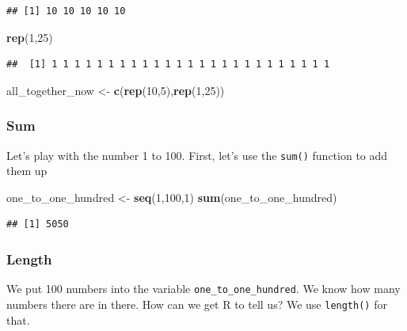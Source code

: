 \documentclass[
]{book}
\newenvironment{Shaded}{\begin{snugshade}}{\end{snugshade}}
\newcommand{\DecValTok}[1]{\textcolor[rgb]{0.00,0.00,0.81}{#1}}
\newcommand{\FunctionTok}[1]{\textcolor[rgb]{0.13,0.29,0.53}{\textbf{#1}}}
\newcommand{\NormalTok}[1]{#1}
\newcommand{\OtherTok}[1]{\textcolor[rgb]{0.56,0.35,0.01}{#1}}
\begin{document}
\begin{verbatim}
## [1] 10 10 10 10 10
\end{verbatim}

\begin{Shaded}
\begin{Highlighting}[]
\FunctionTok{rep}\NormalTok{(}\DecValTok{1}\NormalTok{,}\DecValTok{25}\NormalTok{)}
\end{Highlighting}
\end{Shaded}

\begin{verbatim}
##  [1] 1 1 1 1 1 1 1 1 1 1 1 1 1 1 1 1 1 1 1 1 1 1 1 1 1
\end{verbatim}

\begin{Shaded}
\begin{Highlighting}[]
\NormalTok{all\_together\_now }\OtherTok{\textless{}{-}} \FunctionTok{c}\NormalTok{(}\FunctionTok{rep}\NormalTok{(}\DecValTok{10}\NormalTok{,}\DecValTok{5}\NormalTok{),}\FunctionTok{rep}\NormalTok{(}\DecValTok{1}\NormalTok{,}\DecValTok{25}\NormalTok{)) }
\end{Highlighting}
\end{Shaded}

\hypertarget{sum}{%
\subsubsection{Sum}\label{sum}}

Let's play with the number 1 to 100. First, let's use the \texttt{sum()} function to add them up

\begin{Shaded}
\begin{Highlighting}[]
\NormalTok{one\_to\_one\_hundred }\OtherTok{\textless{}{-}} \FunctionTok{seq}\NormalTok{(}\DecValTok{1}\NormalTok{,}\DecValTok{100}\NormalTok{,}\DecValTok{1}\NormalTok{)}
\FunctionTok{sum}\NormalTok{(one\_to\_one\_hundred)}
\end{Highlighting}
\end{Shaded}

\begin{verbatim}
## [1] 5050
\end{verbatim}

\hypertarget{length}{%
\subsubsection{Length}\label{length}}

We put 100 numbers into the variable \texttt{one\_to\_one\_hundred}. We know how many numbers there are in there. How can we get R to tell us? We use \texttt{length()} for that.
\end{document}
